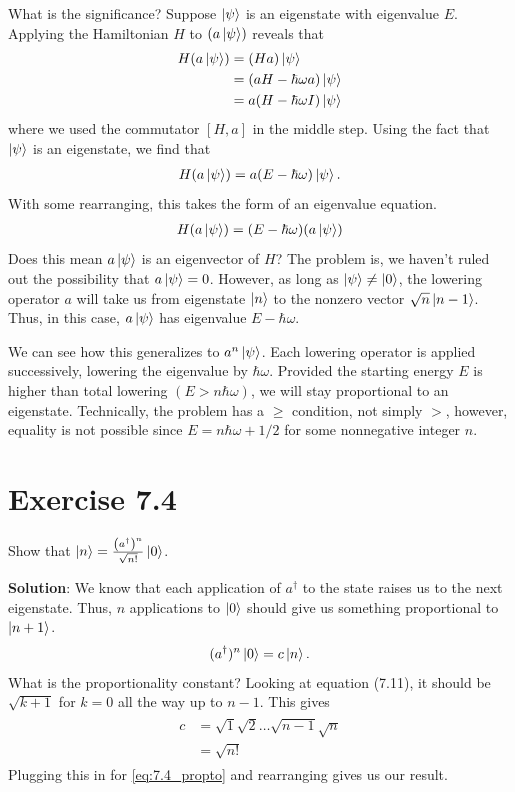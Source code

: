 \documentclass{book}
\begin{document}
    What is the significance? Suppose $\ket{\psi}$ is an eigenstate with eigenvalue $E$. Applying the Hamiltonian $H$ to $(a\ket{\psi})$ reveals that
    \begin{align}
    \begin{aligned}
        H (a\ket{\psi}) &= (Ha) \ket{\psi} \\
        &= (aH - \hbar \omega a)\ket{\psi} \\
        &= a(H- \hbar \omega I) \ket{\psi}
    \end{aligned}
    \end{align}
    where we used the commutator $[H,a]$ in the middle step. Using the fact that $\ket{\psi}$ is an eigenstate, we find that
    \begin{align}
        H(a\ket{\psi}) = a(E-\hbar\omega) \ket{\psi}.
    \end{align}
    With some rearranging, this takes the form of an eigenvalue equation.
    \begin{align}
        H(a\ket{\psi}) = (E-\hbar\omega) (a\ket{\psi})
    \end{align}
    Does this mean $a\ket{\psi}$ is an eigenvector of $H$? The problem is, we haven't ruled out the possibility that $a\ket{\psi} = 0$. However, as long as $\ket{\psi} \neq \ket{0}$, the lowering operator $a$ will take us from eigenstate $\ket{n}$ to the nonzero vector $\sqrt{n} \ket{n-1}$. Thus, in this case, $a\ket{\psi}$ has eigenvalue $E - \hbar \omega$.

    We can see how this generalizes to $a^n \ket{\psi}$. Each lowering operator is applied successively, lowering the eigenvalue by $\hbar \omega$. Provided the starting energy $E$ is higher than total lowering $(E > n \hbar \omega)$, we will stay proportional to an eigenstate. Technically, the problem has a $\geq$ condition, not simply $>$, however, equality is not possible since $E = n\hbar \omega + 1/2$ for some nonnegative integer $n$.

\section*{Exercise 7.4}
    Show that $\ket{n} = \frac{\left(a^\dagger\right)^n}{\sqrt{n!}} \ket{0}$.

    \textbf{Solution}: We know that each application of $a^\dagger$ to the state raises us to the next eigenstate. Thus, $n$ applications to $\ket{0}$ should give us something proportional to $\ket{n+1}$.
    \begin{align} \label{eq:7.4_propto}
        (a^\dagger)^n \ket{0} = c \ket{n}.
    \end{align}
    What is the proportionality constant? Looking at equation (7.11), it should be $\sqrt{k+1}$ for $k = 0$ all the way up to $n-1$. This gives
    \begin{align}
    \begin{aligned}
        c &= \sqrt{1}\sqrt{2} \dots \sqrt{n-1} \sqrt{n} \\
        &= \sqrt{n!}
    \end{aligned}
    \end{align}
    Plugging this in for \eqref{eq:7.4_propto} and rearranging gives us our result.
\end{document}
